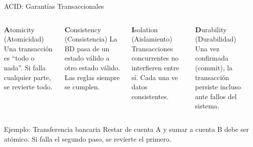 \documentclass[aspectratio=169]{beamer}
\begin{document}
\begin{frame}{ACID: Garantías Transaccionales}
    \begin{columns}[t]
        \begin{block}{\textbf{A}tomicity (Atomicidad)}
            Una transacción es ``todo o nada''. Si falla cualquier parte, se revierte todo.
        \end{block}
        
        \begin{block}{\textbf{C}onsistency (Consistencia)}
            La BD pasa de un estado válido a otro estado válido. Las reglas siempre se cumplen.
        \end{block}
        
        \begin{block}{\textbf{I}solation (Aislamiento)}
            Transacciones concurrentes no interfieren entre sí. Cada una ve datos consistentes.
        \end{block}
        
        \begin{block}{\textbf{D}urability (Durabilidad)}
            Una vez confirmada (commit), la transacción persiste incluso ante fallos del sistema.
        \end{block}
    \end{columns}
    
    \vspace{0.4cm}
    \begin{exampleblock}{Ejemplo: Transferencia bancaria}
        Restar de cuenta A y sumar a cuenta B debe ser atómico. Si falla el segundo paso, se revierte el primero.
    \end{exampleblock}
\end{frame}
\end{document}
